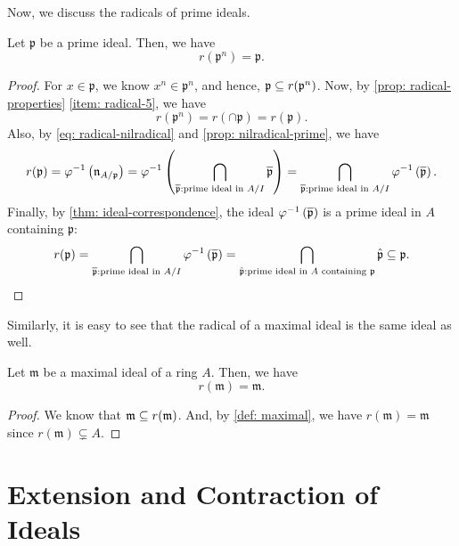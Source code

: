 Now, we discuss the radicals of prime ideals. 
\begin{proposition}
Let $\mathfrak{p}$ be a prime ideal. Then, we have
    \[r(\mathfrak{p}^n) = \mathfrak{p}.\]
\end{proposition}
\begin{proof}
    For $x \in \mathfrak{p}$, we know $x^n \in \mathfrak{p}^n$, and hence, $\mathfrak{p} \ss r(\mathfrak{p}^n)$. Now, by \cref{prop: radical-properties} \eqref{item: radical-5}, we have 
    \[r(\mathfrak{p}^n) = r(\cap \mathfrak{p}) = r(\mathfrak{p}).\]
    Also, by \cref{eq: radical-nilradical} and \cref{prop: nilradical-prime}, we have 
    \[
    r(\mathfrak{p}) = \varphi^{-1}\paren{\mathfrak{n}_{A/\mathfrak{p}}} = 
    \varphi^{-1}\paren{\bigcap_{\ol{\mathfrak{p}}: \text{prime ideal in }A/I} \ol{\mathfrak{p}}} = \bigcap_{\ol{\mathfrak{p}}: \text{prime ideal in }A/I} \varphi^{-1}\paren{\ol{\mathfrak{p}}}.
    \]
    Finally, by \cref{thm: ideal-correspondence}, the ideal $\varphi^{-1}\paren{\ol{\mathfrak{p}}}$ is a prime ideal in $A$ containing $\mathfrak{p}$:
    \[
    r(\mathfrak{p}) = \bigcap_{\ol{\mathfrak{p}}: \text{prime ideal in }A/I} \varphi^{-1}\paren{\ol{\mathfrak{p}}} = \bigcap_{\hat{\mathfrak{p}}: \text{prime ideal in }A\text{ containing }\mathfrak{p}} \hat{\mathfrak{p}} \ss \mathfrak{p}.
    \]
\end{proof}
Similarly, it is easy to see that the radical of a maximal ideal is the same ideal as well.
\begin{proposition}
    Let $\mathfrak{m}$ be a maximal ideal of a ring $A$. Then, we have
    \[r(\mathfrak{m}) = \mathfrak{m}.\]
\end{proposition}
\begin{proof}
    We know that $\mathfrak{m} \ss r(\mathfrak{m})$. And, by \cref{def: maximal}, we have $r(\mathfrak{m}) = \mathfrak{m}$ since $r(\mathfrak{m}) \subsetneq A$.
\end{proof}

\section{Extension and Contraction of Ideals}

